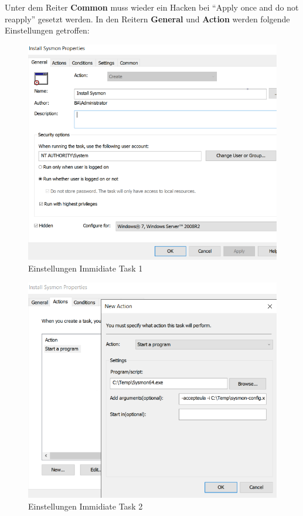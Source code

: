 Unter dem Reiter \textbf{Common} muss wieder ein Hacken bei ``Apply once and do not reapply'' gesetzt werden.
In den Reitern \textbf{General} und \textbf{Action} werden folgende Einstellungen getroffen:\\
\begin{minipage}{0.5\linewidth}
    \begin{figure}[H]
        \centering
        \includegraphics[width=\linewidth]{../img/sysmon/scheduled-task-general.png}
        \caption{Einstellungen Immidiate Task 1}
    \end{figure}

\end{minipage}
\begin{minipage}{0.5\linewidth}
    \begin{figure}[H]
        \centering
        \includegraphics[width=\linewidth]{../img/sysmon/scheduled-task-action.png}
        \caption{Einstellungen Immidiate Task 2}
    \end{figure}
\end{minipage}\\

